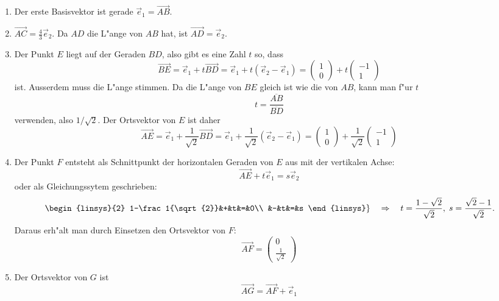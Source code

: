 \begin{loesung}
\begin{teilaufgaben}
\item
\begin{enumerate}
\item Der erste Basisvektor ist gerade $\vec{e}_1=\overrightarrow{AB}$.
\item $\overrightarrow{AC}=\frac43 \vec{e}_2$.
Da $AD$ die L"ange von $AB$ hat, ist $\overrightarrow{AD}=\vec{e}_2$.
\item Der Punkt $E$ liegt auf der Geraden $BD$, also gibt es eine
Zahl  $t$ so, dass
\[
\overrightarrow{BE}
=
\vec{e}_1+t\overrightarrow{BD}
=
\vec{e}_1+t(\vec{e}_2-\vec{e}_1)
=
\begin{pmatrix}1\\0\end{pmatrix}+t\begin{pmatrix}-1\\1\end{pmatrix}
\]
ist.
Ausserdem muss die L"ange stimmen.
Da die L"ange von $BE$ gleich ist wie die von $AB$, kann man f"ur $t$
\[
t=\frac{\overline{AB}}{\overline{BD}}
\]
verwenden, also $1/\sqrt{2}$.
Der Ortsvektor von $E$ ist daher
\[
\overrightarrow{AE}
=
\vec{e}_1+\frac1{\sqrt{2}}\overrightarrow{BD}
=
\vec{e}_1+\frac1{\sqrt{2}}(\vec{e}_2-\vec{e}_1)
=
\begin{pmatrix}1\\0\end{pmatrix}+\frac1{\sqrt{2}}\begin{pmatrix}-1\\1\end{pmatrix}
\]
\item Der Punkt $F$ entsteht als Schnittpunkt der horizontalen Geraden von
$E$ aus mit der vertikalen Achse:
\[
\overrightarrow{AE}+t\vec{e}_1 = s\vec{e}_2
\]
oder als Gleichungssytem geschrieben:
\[
\left.
\begin{linsys}{2}
1-\frac1{\sqrt{2}}&+&t&=&0\\
                  &-&t&=&s
\end{linsys}
\right\}
\quad\Rightarrow\quad
t=\frac{1-\sqrt{2}}{\sqrt{2}},
\;
s=\frac{\sqrt{2}-1}{\sqrt{2}}.
\]
Daraus erh"alt man durch Einsetzen den Ortsvektor von $F$:
\[
\overrightarrow{AF}
=
\begin{pmatrix}
0\\\frac1{\sqrt{2}}
\end{pmatrix}
\]
\item Der Ortsvektor von $G$ ist
\[
\overrightarrow{AG}
=
\overrightarrow{AF}+\vec{e}_1
\]
\end{enumerate}
\end{teilaufgaben}
\end{loesung}
